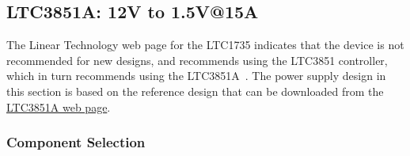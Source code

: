 \subsection{LTC3851A: 12V to 1.5V@15A}

The Linear Technology web page for the LTC1735 indicates that
the device is not recommended for new designs, and recommends
using the LTC3851 controller, which in turn recommends using
the LTC3851A~\cite{Linear_LTC3851A_2010}. The power supply 
design in this section is based on the reference design that
can be downloaded from the
\href{http://www.linear.com/product/LTC3851A}{LTC3851A web page}.

\subsubsection{Component Selection}

